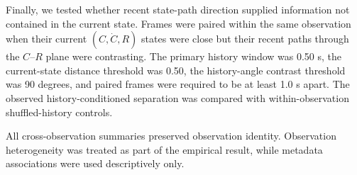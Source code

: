 Finally, we tested whether recent state-path direction supplied information
not contained in the current state. Frames were paired within the same
observation when their current $(C,\dot{C},R)$ states were close but their
recent paths through the $C$--$R$ plane were contrasting. The primary history
window was 0.50 s, the current-state distance threshold was 0.50, the
history-angle contrast threshold was 90 degrees, and paired frames were
required to be at least 1.0 s apart. The observed history-conditioned
separation was compared with within-observation shuffled-history controls.

All cross-observation summaries preserved observation identity. Observation
heterogeneity was treated as part of the empirical result, while metadata
associations were used descriptively only.
